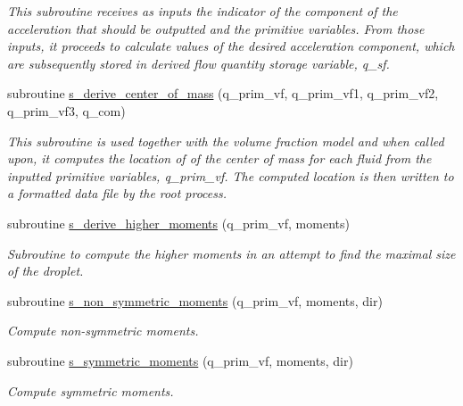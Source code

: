 \begin{DoxyCompactItemize}
\begin{DoxyCompactList}\small\item\em This subroutine receives as inputs the indicator of the component of the acceleration that should be outputted and the primitive variables. From those inputs, it proceeds to calculate values of the desired acceleration component, which are subsequently stored in derived flow quantity storage variable, q\+\_\+sf. \end{DoxyCompactList}\item 
subroutine \hyperlink{namespacem__derived__variables_a1a849dc545128f9a6de155bed61035ff}{s\+\_\+derive\+\_\+center\+\_\+of\+\_\+mass} (q\+\_\+prim\+\_\+vf, q\+\_\+prim\+\_\+vf1, q\+\_\+prim\+\_\+vf2, q\+\_\+prim\+\_\+vf3, q\+\_\+com)
\begin{DoxyCompactList}\small\item\em This subroutine is used together with the volume fraction model and when called upon, it computes the location of of the center of mass for each fluid from the inputted primitive variables, q\+\_\+prim\+\_\+vf. The computed location is then written to a formatted data file by the root process. \end{DoxyCompactList}\item 
subroutine \hyperlink{namespacem__derived__variables_ab28af564606ca901d3953e6012e9a452}{s\+\_\+derive\+\_\+higher\+\_\+moments} (q\+\_\+prim\+\_\+vf, moments)
\begin{DoxyCompactList}\small\item\em Subroutine to compute the higher moments in an attempt to find the maximal size of the droplet. \end{DoxyCompactList}\item 
subroutine \hyperlink{namespacem__derived__variables_a2ee18c156bb444c6ab73d4762960ef67}{s\+\_\+non\+\_\+symmetric\+\_\+moments} (q\+\_\+prim\+\_\+vf, moments, dir)
\begin{DoxyCompactList}\small\item\em Compute non-\/symmetric moments. \end{DoxyCompactList}\item 
subroutine \hyperlink{namespacem__derived__variables_ade52fa354cc5b681c4d6ef6fc8b2c61b}{s\+\_\+symmetric\+\_\+moments} (q\+\_\+prim\+\_\+vf, moments, dir)
\begin{DoxyCompactList}\small\item\em Compute symmetric moments. \end{DoxyCompactList}\item 

\end{DoxyCompactItemize}
